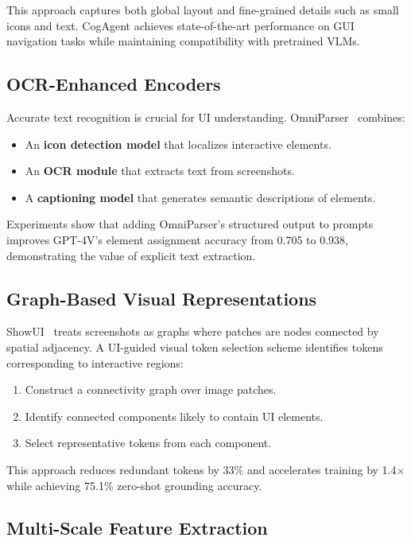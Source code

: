 \documentclass[11pt]{article}
\begin{document}
This approach captures both global layout and fine-grained details such as small icons and text. CogAgent achieves state-of-the-art performance on GUI navigation tasks while maintaining compatibility with pretrained VLMs.

\subsection{OCR-Enhanced Encoders}

Accurate text recognition is crucial for UI understanding. OmniParser~\cite{omniparser2024} combines:

\begin{itemize}
    \item An \textbf{icon detection model} that localizes interactive elements.
    \item An \textbf{OCR module} that extracts text from screenshots.
    \item A \textbf{captioning model} that generates semantic descriptions of elements.
\end{itemize}

Experiments show that adding OmniParser's structured output to prompts improves GPT-4V's element assignment accuracy from 0.705 to 0.938, demonstrating the value of explicit text extraction.

\subsection{Graph-Based Visual Representations}

ShowUI~\cite{showui2024} treats screenshots as graphs where patches are nodes connected by spatial adjacency. A UI-guided visual token selection scheme identifies tokens corresponding to interactive regions:

\begin{enumerate}
    \item Construct a connectivity graph over image patches.
    \item Identify connected components likely to contain UI elements.
    \item Select representative tokens from each component.
\end{enumerate}

This approach reduces redundant tokens by 33\% and accelerates training by 1.4$\times$ while achieving 75.1\% zero-shot grounding accuracy.

\subsection{Multi-Scale Feature Extraction}
\end{document}

